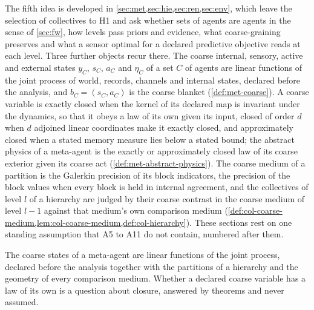 The fifth idea is developed in \cref{sec:met,sec:hie,sec:ren,sec:env}, which leave the selection of collectives to H1 and ask whether sets of agents are agents in the sense of \cref{sec:fw}, how levels pass priors and evidence, what coarse-graining preserves and what a sensor optimal for a declared predictive objective reads at each level. Three further objects recur there. The coarse internal, sensory, active and external states $y_C$, $s_C$, $a_C$ and $\eta_C$ of a set $C$ of agents are linear functions of the joint process of world, records, channels and internal states, declared before the analysis, and $b_C=(s_C,a_C)$ is the coarse blanket (\cref{def:met-coarse}). A coarse variable is exactly closed when the kernel of its declared map is invariant under the dynamics, so that it obeys a law of its own given its input, closed of order $d$ when $d$ adjoined linear coordinates make it exactly closed, and approximately closed when a stated memory measure lies below a stated bound; the abstract physics of a meta-agent is the exactly or approximately closed law of its coarse exterior given its coarse act (\cref{def:met-abstract-physics}). The coarse medium of a partition is the Galerkin precision of its block indicators, the precision of the block values when every block is held in internal agreement, and the collectives of level $l$ of a hierarchy are judged by their coarse contrast in the coarse medium of level $l-1$ against that medium's own comparison medium (\cref{def:col-coarse-medium,lem:col-coarse-medium,def:col-hierarchy}). These sections rest on one standing assumption that A5 to A11 do not contain, numbered after them.

\begin{premise}\label{asm:int-a12}
The coarse states of a meta-agent are linear functions of the joint process, declared before the analysis together with the partitions of a hierarchy and the geometry of every comparison medium. Whether a declared coarse variable has a law of its own is a question about closure, answered by theorems and never assumed.
\end{premise}

